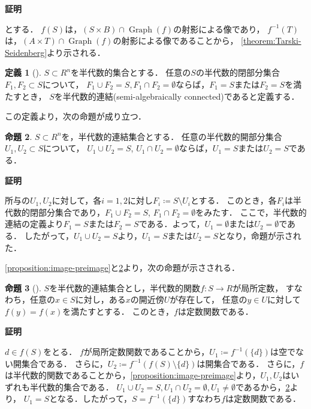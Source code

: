 \documentclass[uplatex, dvipdfmx]{jsarticle}
\makeatletter
\numberwithin{equation}{section}
\renewenvironment{proof}[1][\proofname]{\par
  \pushQED{\qed}%
  \normalfont \topsep6\p@\@plus6\p@\relax
  \trivlist
  \item\relax
  {\bfseries
  #1\@addpunct{.}}\hspace\labelsep\ignorespaces
}{
  \popQED\endtrivlist\@endpefalse
}
\newcommand{\map}[3]{{#1}\colon{#2}\rightarrow{#3}}
\DeclareMathOperator{\Graph}{Graph}
\theoremstyle{definition}
\newtheorem{definition}{定義}[section]
\newtheorem{proposition}[definition]{命題}
\renewcommand{\proofname}{\textbf{証明}}
\makeatother
\begin{document}
\begin{proof}
     とする．
     $f(S)$は，$(S \times B) \cap \Graph(f)$の射影による像であり，
     $f^{-1}(T)$は，$(A \times T) \cap \Graph(f)$の射影による像であることから，
     \cref{theorem:Tarski-Seidenberg}より示される．
\end{proof}

\begin{definition}[{\cite[Definition 2.4.2]{MR1659509}}]
     $S \subset R^n$を半代数的集合とする．
     任意の$S$の半代数的閉部分集合$F_1, F_2 \subset S$について，
     $F_1 \cup F_2 = S, F_1 \cap F_2 = \emptyset$ならば，$F_1 = S$または$F_2 = S$を満たすとき，
     $S$を半代数的連結(semi-algebraically connected)であると定義する．
\end{definition}

この定義より，次の命題が成り立つ．

\begin{proposition}\label{proposition:connectedness}
     $S \subset R^n$を，半代数的連結集合とする．
     任意の半代数的開部分集合$U_1, U_2 \subset S$について，
     $U_1 \cup U_2 = S$, $U_1 \cap U_2 = \emptyset$ならば，$U_1 = S$または$U_2 = S$である．
\end{proposition}

\begin{proof}
     所与の$U_1, U_2$に対して，各$i=1, 2$に対し$F_i\coloneqq S \setminus U_i$とする．
     このとき，各$F_i$は半代数的閉部分集合であり，$F_1 \cup F_2 = S$, $F_1 \cap F_2 = \emptyset$をみたす．
     ここで，半代数的連結の定義より$F_1 = S$または$F_2 = S$である．よって，$U_1 = \emptyset$または$U_2 = \emptyset$である．
     したがって，$U_1 \cup U_2 = S$より，$U_1 = S$または$U_2 = S$となり，命題が示された．
\end{proof}

\cref{proposition:image-preimage}と\cref{proposition:connectedness}より，次の命題が示さされる．

\begin{proposition}[{\cite[Proposition 3.9]{MR2248869}}]\label{proposition:locally-constant}
     $S$を半代数的連結集合とし，半代数的関数$\map{f}{S}{R}$が局所定数，
     すなわち，任意の$x \in S$に対し，ある$x$の開近傍$U$が存在して，
     任意の$y \in U$に対して$f(y)=f(x)$を満たすとする．
     このとき，$f$は定数関数である．
\end{proposition}
\begin{proof}
     $d \in f(S)$をとる．
     $f$が局所定数関数であることから，$U_1\coloneqq f^{-1}(\{d\})$は空でない開集合である．
     さらに，$U_2\coloneqq f^{-1}(f(S) \setminus \{d\})$は開集合である．
     さらに，$f$は半代数的関数であることから，\cref{proposition:image-preimage}より，$U_1, U_2$はいずれも半代数的集合である．
     $U_1 \cup U_2 = S, U_1 \cap U_2 = \emptyset, U_1 \neq \emptyset$であるから，\cref{proposition:connectedness}より，
     $U_1 = S$となる．したがって，$S = f^{-1}(\{d\})$すなわち$f$は定数関数である．
\end{proof}
\end{document}
